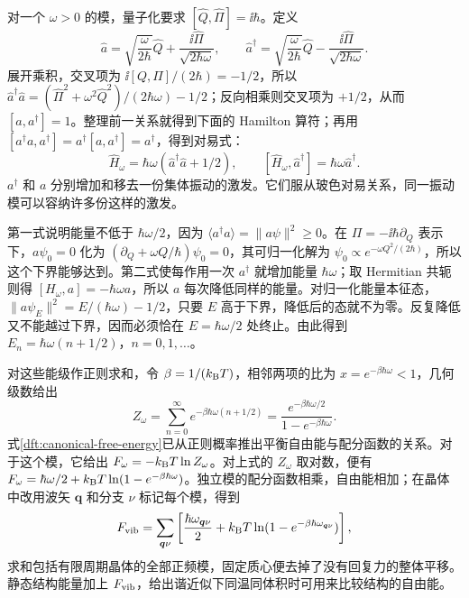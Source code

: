 对一个 $\omega>0$ 的模，量子化要求 $[\hat Q,\hat\Pi]=\ii\hbar$。定义
\begin{equation}
\hat a=\sqrt{\frac\omega{2\hbar}}\hat Q
+\frac{\ii\hat\Pi}{\sqrt{2\hbar\omega}},\qquad
\hat a^\dagger=\sqrt{\frac\omega{2\hbar}}\hat Q
-\frac{\ii\hat\Pi}{\sqrt{2\hbar\omega}}.
\end{equation}
展开乘积，交叉项为 $\ii[Q,\Pi]/(2\hbar)=-1/2$，所以 $\hat a^\dagger\hat a=(\hat\Pi^2+\omega^2\hat Q^2)/(2\hbar\omega)-1/2$；反向相乘则交叉项为 $+1/2$，从而 $[a,a^\dagger]=1$。整理前一关系就得到下面的 Hamilton 算符；再用 $[a^\dagger a,a^\dagger]=a^\dagger[a,a^\dagger]=a^\dagger$，得到对易式：
\begin{equation}
\hat H_\omega=\hbar\omega(\hat a^\dagger\hat a+1/2),\qquad
[\hat H_\omega,\hat a^\dagger]=\hbar\omega\hat a^\dagger.
\end{equation}
$a^\dagger$ 和 $a$ 分别增加和移去一份集体振动的激发。它们服从玻色对易关系，同一振动模可以容纳许多份这样的激发。

第一式说明能量不低于 $\hbar\omega/2$，因为 $\langle a^\dagger a\rangle=\|a\psi\|^2\ge0$。在 $\Pi=-\ii\hbar\partial_Q$ 表示下，$a\psi_0=0$ 化为 $(\partial_Q+\omega Q/\hbar)\psi_0=0$，其可归一化解为 $\psi_0\propto e^{-\omega Q^2/(2\hbar)}$，所以这个下界能够达到。第二式使每作用一次 $a^\dagger$ 就增加能量 $\hbar\omega$；取 Hermitian 共轭则得 $[H_\omega,a]=-\hbar\omega a$，所以 $a$ 每次降低同样的能量。对归一化能量本征态，$\|a\psi_E\|^2=E/(\hbar\omega)-1/2$，只要 $E$ 高于下界，降低后的态就不为零。反复降低又不能越过下界，因而必须恰在 $E=\hbar\omega/2$ 处终止。由此得到 $E_n=\hbar\omega(n+1/2)$，$n=0,1,\ldots$。

对这些能级作正则求和，令 $\beta=1/(k_{\mathrm B} T)$，相邻两项的比为 $x=e^{-\beta\hbar\omega}<1$，几何级数给出
\begin{equation}
Z_\omega=\sum_{n=0}^\infty e^{-\beta\hbar\omega(n+1/2)}
=\frac{e^{-\beta\hbar\omega/2}}{1-e^{-\beta\hbar\omega}}.
\end{equation}
式\eqref{dft:canonical-free-energy}已从正则概率推出平衡自由能与配分函数的关系。对于这个模，它给出 $F_\omega=-k_{\mathrm B} T\ln Z_\omega$。对上式的 $Z_\omega$ 取对数，便有 $F_\omega=\hbar\omega/2+k_{\mathrm B} T\ln(1-e^{-\beta\hbar\omega})$。独立模的配分函数相乘，自由能相加；在晶体中改用波矢 $\bm q$ 和分支 $\nu$ 标记每个模，得到
\begin{equation}
F_{\rm vib}=\sum_{\bm q\nu}\left[\frac{\hbar\omega_{\bm q\nu}}2+k_{\mathrm B} T\ln(1-e^{-\beta\hbar\omega_{\bm q\nu}})\right],
\end{equation}
求和包括有限周期晶体的全部正频模，固定质心便去掉了没有回复力的整体平移。静态结构能量加上 $F_{\rm vib}$，给出谐近似下同温同体积时可用来比较结构的自由能。

